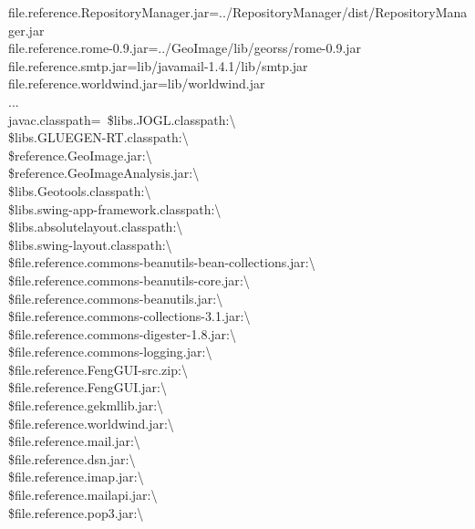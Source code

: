 \documentclass[12pt,a4paper,final,makeidx]{report}
\begin{document}
\begin{tiny}
file.reference.RepositoryManager.jar=../RepositoryManager/dist/RepositoryManager.jar\\
file.reference.rome-0.9.jar=../GeoImage/lib/georss/rome-0.9.jar\\
file.reference.smtp.jar=lib/javamail-1.4.1/lib/smtp.jar\\
file.reference.worldwind.jar=lib/worldwind.jar\\
...\\
javac.classpath=\
\${libs.JOGL.classpath}:\textbackslash \\
\${libs.GLUEGEN-RT.classpath}:\textbackslash \\
\${reference.GeoImage.jar}:\textbackslash \\
\${reference.GeoImageAnalysis.jar}:\textbackslash \\
\${libs.Geotools.classpath}:\textbackslash \\
\${libs.swing-app-framework.classpath}:\textbackslash \\
\${libs.absolutelayout.classpath}:\textbackslash \\
\${libs.swing-layout.classpath}:\textbackslash \\
\${file.reference.commons-beanutils-bean-collections.jar}:\textbackslash \\
\${file.reference.commons-beanutils-core.jar}:\textbackslash \\
\${file.reference.commons-beanutils.jar}:\textbackslash \\
\${file.reference.commons-collections-3.1.jar}:\textbackslash \\
\${file.reference.commons-digester-1.8.jar}:\textbackslash \\
\${file.reference.commons-logging.jar}:\textbackslash \\
\${file.reference.FengGUI-src.zip}:\textbackslash \\
\${file.reference.FengGUI.jar}:\textbackslash \\
\${file.reference.gekmllib.jar}:\textbackslash \\
\${file.reference.worldwind.jar}:\textbackslash \\
\${file.reference.mail.jar}:\textbackslash \\
\${file.reference.dsn.jar}:\textbackslash \\
\${file.reference.imap.jar}:\textbackslash \\
\${file.reference.mailapi.jar}:\textbackslash \\
\${file.reference.pop3.jar}:\textbackslash \\

\end{tiny}
\end{document}
